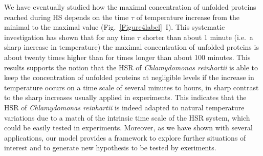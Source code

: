 \documentclass[oneside, 10pt, a4paper, twocolumn]{article}
\begin{document}

We have eventually studied how the maximal concentration of unfolded proteins reached during HS depends on the time $\tau$ of temperature increase from the minimal to the maximal value (Fig.~\ref{Figure4label}~I). This systematic investigation has shown that  for any time $\tau$ shorter than about 1 minute (i.e.~a sharp increase in temperature) the maximal concentration of unfolded proteins is about twenty times higher than for  times longer than about 100 minutes.
This results supports the notion that the HSR of \emph{Chlamydomonas reinhartii} is able to keep the concentration of unfolded proteins at
negligible levels if the increase in temperature occurs on a time scale of several minutes to hours, in sharp contrast to the sharp increases usually applied in experiments. %
This indicates that the HSR of \emph{Chlamydomonas reinhartii} is indeed adapted to natural temperature variations due to a match of the intrinsic time scale of the HSR system, which could be easily tested in experiments. 
Moreover, as we have shown with several applications, our model provides a framework to explore further situations of interest and to generate new hypothesis to be tested by exeriments.
\end{document}
